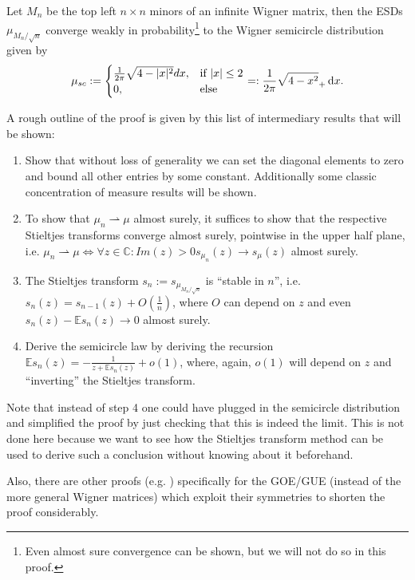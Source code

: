 \begin{theorem}\label{thm:semicircle}
	Let $M_n$ be the top left $n\times n$ minors of an infinite Wigner matrix, then the ESDs $\mu_{M_n/\sqrt{n}}$ converge weakly in probability\footnote{Even almost sure convergence can be shown, but we will not do so in this proof.} to the Wigner semicircle distribution given by
	\begin{equation*}
		\mu_{sc}:=\begin{cases}
						\frac{1}{2\pi}\sqrt{4-|x|^2}dx, &\mbox{if } |x|\leq 2 \\
						0, &\mbox{else}
					  \end{cases}=:\frac{1}{2\pi}\sqrt{4-x^2}_+\mathop{}\!\mathrm{d} x.
	\end{equation*}
\end{theorem}
A rough outline of the proof is given by this list of intermediary results that will be shown:
\begin{enumerate}
	\item Show that without loss of generality we can set the diagonal elements to zero and bound all other entries by some constant. Additionally some classic concentration of measure results will be shown.
	\item To show that $\mu_n\rightharpoonup\mu$ almost surely, it suffices to show that the respective Stieltjes transforms converge almost surely, pointwise in the upper half plane, i.e. $\mu_n\rightharpoonup\mu\Leftrightarrow\forall z\in\mathbb C:Im(z)>0 s_{\mu_n}(z)\rightarrow s_\mu(z)$ almost surely.
	\item The Stieltjes transform $s_n := s_{\mu_{M_n/\sqrt{n}}}$ is ``stable in $n$'', i.e. $s_n(z)=s_{n-1}(z)+O(\frac{1}{n})$, where $O$ can depend on $z$ and even $s_n(z)-\mathbb E s_n(z)\rightarrow 0$ almost surely.
	\item Derive the semicircle law by deriving the recursion $\mathbb E s_n(z)=-\frac{1}{z+\mathbb E s_n(z)}+o(1)$, where, again, $o(1)$ will depend on $z$ and ``inverting'' the Stieltjes transform.
\end{enumerate}
\begin{remark}
	Note that instead of step 4 one could have plugged in the semicircle distribution and simplified the proof by just checking that this is indeed the limit. This is not done here because we want to see how the Stieltjes transform method can be used to derive such a conclusion without knowing about it beforehand.
	
	Also, there are other proofs (e.g. \cite{scGOE}) specifically for the GOE/GUE (instead of the more general Wigner matrices) which exploit their symmetries to shorten the proof considerably.
\end{remark}

